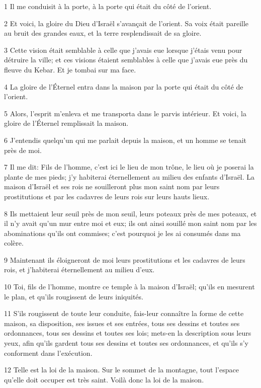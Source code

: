 \par 1 Il me conduisit à la porte, à la porte qui était du côté de l'orient.
\par 2 Et voici, la gloire du Dieu d'Israël s'avançait de l'orient. Sa voix était pareille au bruit des grandes eaux, et la terre resplendissait de sa gloire.
\par 3 Cette vision était semblable à celle que j'avais eue lorsque j'étais venu pour détruire la ville; et ces visions étaient semblables à celle que j'avais eue près du fleuve du Kebar. Et je tombai sur ma face.
\par 4 La gloire de l'Éternel entra dans la maison par la porte qui était du côté de l'orient.
\par 5 Alors, l'esprit m'enleva et me transporta dans le parvis intérieur. Et voici, la gloire de l'Éternel remplissait la maison.
\par 6 J'entendis quelqu'un qui me parlait depuis la maison, et un homme se tenait près de moi.
\par 7 Il me dit: Fils de l'homme, c'est ici le lieu de mon trône, le lieu où je poserai la plante de mes pieds; j'y habiterai éternellement au milieu des enfants d'Israël. La maison d'Israël et ses rois ne souilleront plus mon saint nom par leurs prostitutions et par les cadavres de leurs rois sur leurs hauts lieux.
\par 8 Ils mettaient leur seuil près de mon seuil, leurs poteaux près de mes poteaux, et il n'y avait qu'un mur entre moi et eux; ils ont ainsi souillé mon saint nom par les abominations qu'ils ont commises; c'est pourquoi je les ai consumés dans ma colère.
\par 9 Maintenant ils éloigneront de moi leurs prostitutions et les cadavres de leurs rois, et j'habiterai éternellement au milieu d'eux.
\par 10 Toi, fils de l'homme, montre ce temple à la maison d'Israël; qu'ils en mesurent le plan, et qu'ils rougissent de leurs iniquités.
\par 11 S'ils rougissent de toute leur conduite, fais-leur connaître la forme de cette maison, sa disposition, ses issues et ses entrées, tous ses dessins et toutes ses ordonnances, tous ses dessins et toutes ses lois; mets-en la description sous leurs yeux, afin qu'ils gardent tous ses dessins et toutes ses ordonnances, et qu'ils s'y conforment dans l'exécution.
\par 12 Telle est la loi de la maison. Sur le sommet de la montagne, tout l'espace qu'elle doit occuper est très saint. Voilà donc la loi de la maison.
